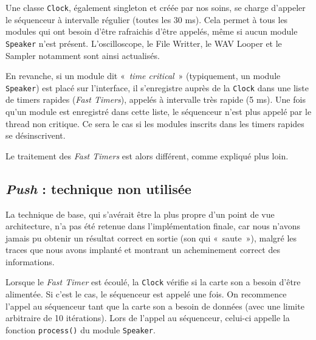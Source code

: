 Une classe \verb!Clock!, également singleton et créée par nos
soins, se charge d'appeler le séquenceur à intervalle régulier
(toutes les 30 ms). Cela permet à tous les modules qui ont besoin
d'être rafraichis d'être appelés, même si aucun module
\verb!Speaker! n'est présent. L'oscilloscope, le File Writter, le
WAV Looper et le Sampler notamment sont ainsi actualisés.

En revanche, si un module dit «~\emph{time critical}~»
(typiquement, un module \verb!Speaker!) est placé sur l'interface,
il s'enregistre auprès de la \verb!Clock! dans une liste de timers
rapides (\emph{Fast Timers}), appelés à intervalle très rapide (5
ms). Une fois qu'un module est enregistré dans cette liste, le
séquenceur n'est plus appelé par le thread non critique. Ce sera le
cas si les modules inscrits dans les timers rapides se
désinscrivent.

Le traitement des \emph{Fast Timers} est alors différent, comme
expliqué plus loin.

\subsection{\emph{Push} : technique non utilisée}

La technique de base, qui s'avérait être la plus propre d'un point
de vue architecture, n'a pas été retenue dans l'implémentation
finale, car nous n'avons jamais pu obtenir un résultat correct en
sortie (son qui «~saute~»), malgré les traces que nous avons
implanté et montrant un acheminement correct des informations.

Lorsque le \emph{Fast Timer} est écoulé, la \verb!Clock! vérifie si
la carte son a besoin d'être alimentée. Si c'est le cas, le
séquenceur est appelé une fois. On recommence l'appel au séquenceur
tant que la carte son a besoin de données (avec une limite
arbitraire de 10 itérations). Lors de l'appel au séquenceur,
celui-ci appelle la fonction \verb!process()! du module
\verb!Speaker!.

